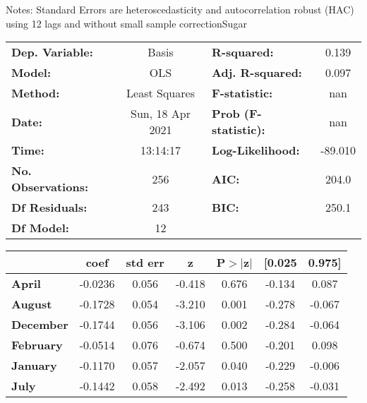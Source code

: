 Notes: \newline
 [1] Standard Errors are heteroscedasticity and autocorrelation robust (HAC) using 12 lags and without small sample correctionSugar\begin{center}
\begin{tabular}{lclc}
\toprule
\textbf{Dep. Variable:}    &      Basis       & \textbf{  R-squared:         } &     0.139   \\
\textbf{Model:}            &       OLS        & \textbf{  Adj. R-squared:    } &     0.097   \\
\textbf{Method:}           &  Least Squares   & \textbf{  F-statistic:       } &       nan   \\
\textbf{Date:}             & Sun, 18 Apr 2021 & \textbf{  Prob (F-statistic):} &      nan    \\
\textbf{Time:}             &     13:14:17     & \textbf{  Log-Likelihood:    } &   -89.010   \\
\textbf{No. Observations:} &         256      & \textbf{  AIC:               } &     204.0   \\
\textbf{Df Residuals:}     &         243      & \textbf{  BIC:               } &     250.1   \\
\textbf{Df Model:}         &          12      & \textbf{                     } &             \\
\bottomrule
\end{tabular}
\begin{tabular}{lcccccc}
                   & \textbf{coef} & \textbf{std err} & \textbf{z} & \textbf{P$> |$z$|$} & \textbf{[0.025} & \textbf{0.975]}  \\
\midrule
\textbf{April}     &      -0.0236  &        0.056     &    -0.418  &         0.676        &       -0.134    &        0.087     \\
\textbf{August}    &      -0.1728  &        0.054     &    -3.210  &         0.001        &       -0.278    &       -0.067     \\
\textbf{December}  &      -0.1744  &        0.056     &    -3.106  &         0.002        &       -0.284    &       -0.064     \\
\textbf{February}  &      -0.0514  &        0.076     &    -0.674  &         0.500        &       -0.201    &        0.098     \\
\textbf{January}   &      -0.1170  &        0.057     &    -2.057  &         0.040        &       -0.229    &       -0.006     \\
\textbf{July}      &      -0.1442  &        0.058     &    -2.492  &         0.013        &       -0.258    &       -0.031     \\

\end{tabular}
\end{center}
